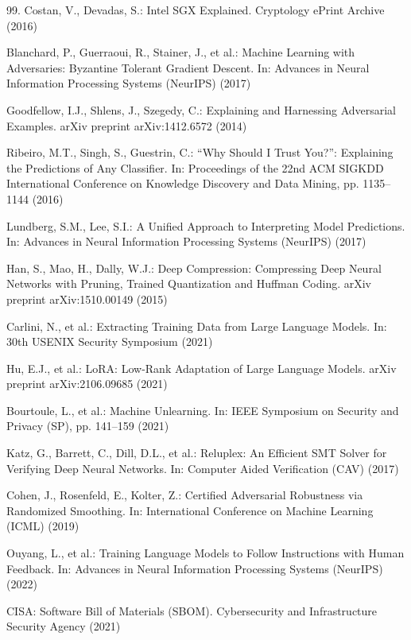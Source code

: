 \begin{thebibliography}{99.}
 Costan, V., Devadas, S.: Intel SGX Explained. Cryptology ePrint Archive (2016)

 Blanchard, P., Guerraoui, R., Stainer, J., et al.: Machine Learning with Adversaries: Byzantine Tolerant Gradient Descent. In: Advances in Neural Information Processing Systems (NeurIPS) (2017)

 Goodfellow, I.J., Shlens, J., Szegedy, C.: Explaining and Harnessing Adversarial Examples. arXiv preprint arXiv:1412.6572 (2014)

 Ribeiro, M.T., Singh, S., Guestrin, C.: ``Why Should I Trust You?'': Explaining the Predictions of Any Classifier. In: Proceedings of the 22nd ACM SIGKDD International Conference on Knowledge Discovery and Data Mining, pp. 1135--1144 (2016)

 Lundberg, S.M., Lee, S.I.: A Unified Approach to Interpreting Model Predictions. In: Advances in Neural Information Processing Systems (NeurIPS) (2017)

 Han, S., Mao, H., Dally, W.J.: Deep Compression: Compressing Deep Neural Networks with Pruning, Trained Quantization and Huffman Coding. arXiv preprint arXiv:1510.00149 (2015)

 Carlini, N., et al.: Extracting Training Data from Large Language Models. In: 30th USENIX Security Symposium (2021)

 Hu, E.J., et al.: LoRA: Low-Rank Adaptation of Large Language Models. arXiv preprint arXiv:2106.09685 (2021)

 Bourtoule, L., et al.: Machine Unlearning. In: IEEE Symposium on Security and Privacy (SP), pp. 141--159 (2021)

 Katz, G., Barrett, C., Dill, D.L., et al.: Reluplex: An Efficient SMT Solver for Verifying Deep Neural Networks. In: Computer Aided Verification (CAV) (2017)

 Cohen, J., Rosenfeld, E., Kolter, Z.: Certified Adversarial Robustness via Randomized Smoothing. In: International Conference on Machine Learning (ICML) (2019)

 Ouyang, L., et al.: Training Language Models to Follow Instructions with Human Feedback. In: Advances in Neural Information Processing Systems (NeurIPS) (2022)

 CISA: Software Bill of Materials (SBOM). Cybersecurity and Infrastructure Security Agency (2021)


\end{thebibliography}
